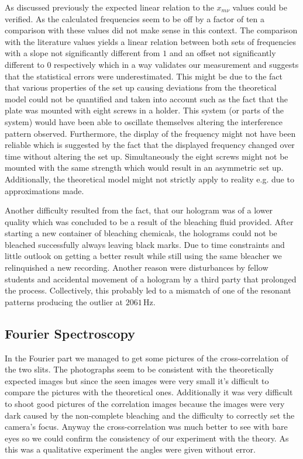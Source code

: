 As discussed previously the expected linear relation to the $x_{m\nu}$ values could be verified. As the calculated frequencies seem to be off by a factor of ten a comparison with these values did not make sense in this context. The comparison with the literature values yields a linear relation between both sets of frequencies with a slope not significantly different from $1$ and an offset not significantly different to $0$ respectively which in a way validates our measurement and suggests that the statistical errors were underestimated. This might be due to the fact that various properties of the set up causing deviations from the theoretical model could not be quantified and taken into account such as the fact that the plate was mounted with eight screws in a holder. This system (or parts of the system) would have been able to oscillate themselves altering the interference pattern observed. Furthermore, the display of the frequency might not have been reliable which is suggested by the fact that the displayed frequency changed over time without altering the set up. Simultaneously the eight screws might not be mounted with the same strength which would result in an asymmetric set up. Additionally, the theoretical model might not strictly apply to reality e.g. due to approximations made.

Another difficulty resulted from the fact, that our hologram was of a lower quality which was concluded to be a result of the bleaching fluid provided. After starting a new container of bleaching chemicals, the holograms could not be bleached successfully always leaving black marks. Due to time constraints and little outlook on getting a better result while still using the same bleacher we relinquished a new recording. Another reason were disturbances by fellow students and accidental movement of a hologram by a third party that prolonged the process. Collectively, this probably led to a mismatch of one of the resonant patterns producing the outlier at $2061\,\mathrm{Hz}$.


\subsection{Fourier Spectroscopy}
In the Fourier part we managed to get some pictures of the cross-correlation of the two slits. The photographs seem to be consistent with the theoretically expected images but since the seen images were very small it's difficult to compare the pictures with the theoretical ones. Additionally it was very difficult to shoot good pictures of the correlation images because the images were very dark caused by the non-complete bleaching and the difficulty to correctly set the camera's focus. 
 Anyway the cross-correlation was much better to see with bare eyes so we could confirm the consistency of our experiment with the theory. As this was a qualitative experiment the angles were given without error.
